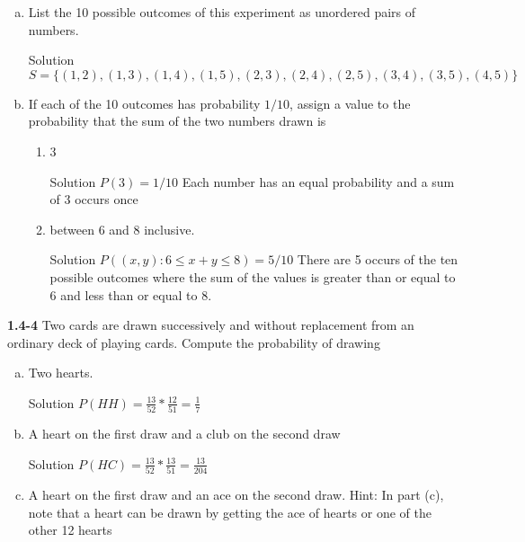 \documentclass{article}
\begin{document}
\begin{spacing}{1.1}
\begin{homeworkProblem}
	\begin{enumerate}[(a)]
		\item List the 10 possible outcomes of this experiment as unordered pairs of numbers. 
			\begin{homeworkSection}{Solution}
				$S = \{ (1,2), (1,3), (1,4), (1,5), (2,3), (2,4), (2,5), (3, 4), (3,5), (4,5)\}$
			\end{homeworkSection}
		\item If each of the 10 outcomes has probability $1/10$, assign a value to the probability that the sum of the two numbers drawn is 
			\begin{enumerate}
				\item 3 
					\begin{homeworkSection}{Solution}
					 	$P( 3) =  1/10$ Each number has an equal probability and a sum of 3 occurs once
					\end{homeworkSection}
				\item between 6 and 8 inclusive.
					\begin{homeworkSection}{Solution}
						$P( (x,y): 6 \le x+y \le 8) = 5/10$ There are 5 occurs of the ten possible outcomes where the sum of the values is greater than or equal to 6 and less than or equal to 8.  
					\end{homeworkSection}
			\end{enumerate}
	\end{enumerate}
\end{homeworkProblem}
\begin{homeworkProblem}
	{\bf 1.4-4} Two cards are drawn successively and without replacement from an ordinary deck of playing cards.  Compute the probability of drawing 
	\begin{enumerate}[(a)]
		\item Two hearts.
			\begin{homeworkSection}{Solution}
				$P( HH) = \frac{13}{52}*\frac{12}{51} = \frac{1}{7}$
			\end{homeworkSection}
		\item A heart on the first draw and a club on the second draw
			\begin{homeworkSection}{Solution}
				$P( HC) = \frac{13}{52}*\frac{13}{51} = \frac{13}{204}$
			\end{homeworkSection}
		\item A heart on the first draw and an ace on the second draw.  Hint: In part (c), note that a heart can be drawn by getting the ace of hearts or one of the other 12 hearts

\end{enumerate}
\end{homeworkProblem}
\end{spacing}
\end{document}
